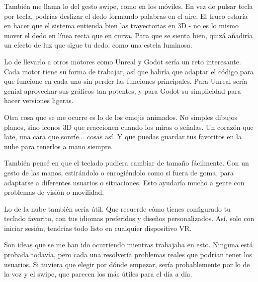 También me llama lo del gesto swipe, como en los móviles. En vez de pulsar tecla por tecla, podrías deslizar el dedo formando palabras en el aire. El truco estaría en hacer que el sistema entienda bien las trayectorias en 3D - no es lo mismo mover el dedo en línea recta que en curva. Para que se sienta bien, quizá añadiría un efecto de luz que sigue tu dedo, como una estela luminosa.

Lo de llevarlo a otros motores como Unreal y Godot sería un reto interesante. Cada motor tiene su forma de trabajar, así que habría que adaptar el código para que funcione en cada uno sin perder las funciones principales. Para Unreal sería genial aprovechar sus gráficos tan potentes, y para Godot su simplicidad para hacer versiones ligeras.

Otra cosa que se me ocurre es lo de los emojis animados. No simples dibujos planos, sino iconos 3D que reaccionen cuando los miras o señalas. Un corazón que late, una cara que sonríe... cosas así. Y que puedas guardar tus favoritos en la nube para tenerlos a mano siempre.

También pensé en que el teclado pudiera cambiar de tamaño fácilmente. Con un gesto de las manos, estirándolo o encogiéndolo como si fuera de goma, para adaptarse a diferentes usuarios o situaciones. Esto ayudaría mucho a gente con problemas de visión o movilidad.

Lo de la nube también sería útil. Que recuerde cómo tienes configurado tu teclado favorito, con tus idiomas preferidos y diseños personalizados. Así, solo con iniciar sesión, tendrías todo listo en cualquier dispositivo VR.

Son ideas que se me han ido ocurriendo mientras trabajaba en esto. Ninguna está probada todavía, pero cada una resolvería problemas reales que podrían tener los usuarios. Si tuviera que elegir por dónde empezar, sería probablemente por lo de la voz y el swipe, que parecen los más útiles para el día a día.